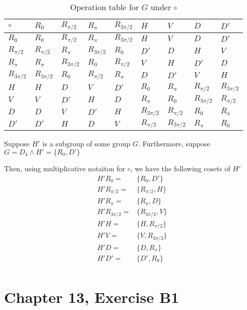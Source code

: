\documentclass[12pt]{article}
\begin{document}
\begin{table}[!ht] 
\begin{tabular}{l|llllllll}
	$\circ$ & $R_0$ & $R_{\pi/2}$ & $R_\pi$ & $R_{3\pi/2}$ & $H$ & $V$ & $D$ & $D'$	\\ \hline
	$R_0$ & $R_0$ & $R_{\pi/2}$ & $R_\pi$ & $R_{3\pi/2}$ & $H$ & $V$ & $D$ & $D'$ \\
	$R_{\pi/2}$ & $R_{\pi/2}$ & $R_\pi$ & $R_{3\pi/2}$ & $R_0$ & $D'$ & $D$ & $H$ & $V$ \\
	$R_\pi$ & $R_\pi$ & $R_{3\pi/2}$ & $R_0$ & $R_{\pi/2}$ & $V$ & $H$ & $D'$ & $D$ \\
	$R_{3\pi/2}$ & $R_{3\pi/2}$ & $R_0$ & $R_{\pi/2}$ & $R_\pi$ & $D$ & $D'$ & $V$ & $H$ 	\\
	$H$ & $H$ & $D$ & $V$ & $D'$ & $R_0$ & $R_\pi$ & $R_{\pi/2}$ & $R_{3\pi/2}$ 	\\
	$V$ & $V$ & $D'$ & $H$ & $D$ & $R_\pi$ & $R_0$ & $R_{3\pi/2}$ & $R_{\pi/2}$ 	\\
	$D$ & $D$ & $V$ & $D'$ & $H$ & $R_{3\pi/2}$ & $R_{\pi/2}$ & $R_0$ & $R_\pi$	\\
	$D'$ & $D'$ & $H$ & $D$ & $V$ & $R_{\pi/2}$ & $R_{3\pi/2}$ & $R_\pi$ & $R_0$	\\
\end{tabular}
\centering
\caption{Operation table for $G$ under $\circ$}
\label{t1}
\end{table}

Suppose $H'$ is a subgroup of some group $G$.
Furthermore, suppose
$G = D_4 \land H' = \{R_0, D' \}$


Then,
using multiplicative notaiton for $\circ$,
we have the following cosets of $H'$
\begin{align*}
	H'R_0 = & \{ R_0, D' \} \\
	H'R_{\pi/2} = & \{ R_{\pi/2}, H \} \\
	H'R_\pi = & \{ R_\pi, D \} \\
	H'R_{3\pi/2} = & \{ R_{3\pi/2}, V \} \\
	H'H = & \{ H, R_{\pi/2} \} \\
	H'V = & \{ V, R_{3\pi/2} \} \\
	H'D = & \{ D, R_\pi \} \\
	H'D' = & \{ D', R_0 \} \\
\end{align*}

% 
% 

\section{Chapter 13, Exercise B1}
\end{document}

